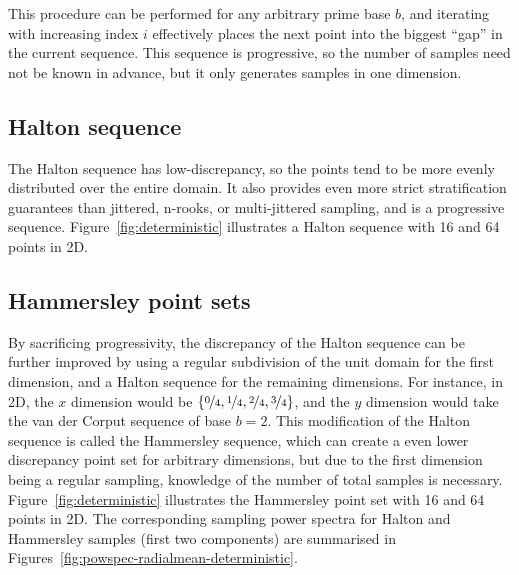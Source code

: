 \documentclass[11pt,fleqn]{book} %
\begin{document}
This procedure can be performed for any arbitrary prime base $b$, and iterating with increasing index $i$ effectively places the next point into the biggest ``gap'' in the current sequence. This sequence is progressive, so the number of samples need not be known in advance, but it only generates samples in one dimension.



\subsection{Halton sequence}
The Halton sequence has low-discrepancy, so the points tend to be more evenly distributed over the entire domain. It also provides even more strict stratification guarantees than jittered, n-rooks, or multi-jittered sampling, and is a progressive sequence. Figure~\ref{fig:deterministic} illustrates a Halton sequence with 16 and 64 points in 2D.

\subsection{Hammersley point sets}
By sacrificing progressivity, the discrepancy of the Halton sequence can be further improved by using a regular subdivision of the unit domain for the first dimension, and a Halton sequence for the remaining dimensions. For instance, in 2D, the $x$ dimension would be $\left\{\nicefrac{0}{4}, \nicefrac{1}{4}, \nicefrac{2}{4}, \nicefrac{3}{4}\right\}$, and the $y$ dimension would take the van der Corput sequence of base $b=2$. This modification of the Halton sequence is called the Hammersley sequence, which can create a even lower discrepancy point set for arbitrary dimensions, but due to the first dimension being a regular sampling, knowledge of the number of total samples is necessary. Figure~\ref{fig:deterministic} illustrates the Hammersley point set with 16 and 64 points in 2D. The corresponding sampling power spectra for Halton and Hammersley samples (first two components) are summarised in  Figures~\ref{fig:powspec-radialmean-deterministic}.
%
%

%
\end{document}

